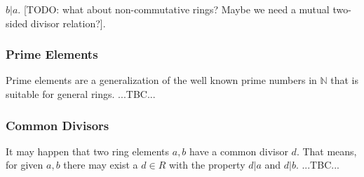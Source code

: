 $b|a$. [TODO: what about non-commutative rings? Maybe we need a mutual two-sided divisor relation?]. 


\subsubsection{Prime Elements}
Prime elements are a generalization of the well known prime numbers in $\mathbb{N}$ that is suitable for general rings. ...TBC...




\subsubsection{Common Divisors}
It may happen that two ring elements $a,b$ have a common divisor $d$. That means, for given $a,b$ there may exist a $d \in R$ with the property $d | a$ and $d | b$. ...TBC...


